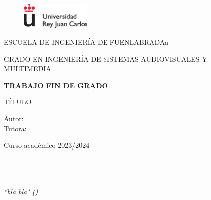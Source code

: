 \documentclass[12pt,a4paper,Spanish]{book}
\begin{document}
\renewcommand{\listtablename}{Índice de tablas} 


\begin{titlepage}
\begin{center}


\begin{figure}
	\centering
\includegraphics[width=0.3\textwidth]{./figs/logoURJC}
\end{figure}

\begin{center}
\large
ESCUELA DE INGENIERÍA DE FUENLABRADAa

\vspace*{0.15in}
GRADO EN INGENIERÍA DE SISTEMAS AUDIOVISUALES Y MULTIMEDIA \\
\vspace*{0.6in}




{\large \bf TRABAJO FIN DE GRADO}\\
\end{center}
\vspace*{0.2in}
{\large
{TÍTULO} \\
}
\vspace*{0.3in}
\vspace*{0.3in}

\vspace*{0.1in}
\end{center}

{\large
Autor:   \\[0.2cm]

Tutora: \\[0.15cm]

}
\vspace*{0.1in}
\vspace*{0.1in}

\begin{center}Curso académico 2023/2024\end{center}



\end{titlepage}
\newpage
$\ $
\thispagestyle{empty} %

\chapter*{}
\begin{flushright}
\textit{“bla bla" ()}

\end{flushright}
\end{document}
